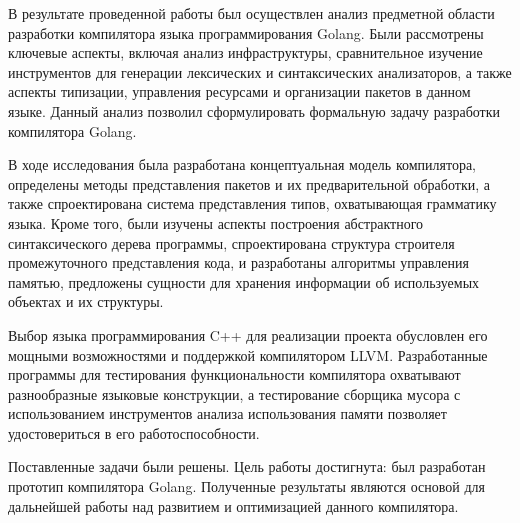 \Conclusion %

В результате проведенной работы был осуществлен анализ предметной области разработки компилятора языка программирования Golang.
Были рассмотрены ключевые аспекты, включая анализ инфраструктуры, сравнительное изучение инструментов для генерации лексических и синтаксических анализаторов, а также аспекты типизации, управления ресурсами и организации пакетов в данном языке.
Данный анализ позволил сформулировать формальную задачу разработки компилятора Golang.

В ходе исследования была разработана концептуальная модель компилятора, определены методы представления пакетов и их предварительной обработки, а также спроектирована система представления типов, охватывающая грамматику языка.
Кроме того, были изучены аспекты построения абстрактного синтаксического дерева программы, спроектирована структура строителя промежуточного представления кода, и разработаны алгоритмы управления памятью, предложены сущности для хранения информации об используемых объектах и их структуры.

Выбор языка программирования C++ для реализации проекта обусловлен его мощными возможностями и поддержкой компилятором LLVM.
Разработанные программы для тестирования функциональности компилятора охватывают разнообразные языковые конструкции, а тестирование сборщика мусора с использованием инструментов анализа использования памяти позволяет удостовериться в его работоспособности.

Поставленные задачи были решены.
Цель работы достигнута: был разработан прототип компилятора Golang.
Полученные результаты являются основой для дальнейшей работы над развитием и оптимизацией данного компилятора.


